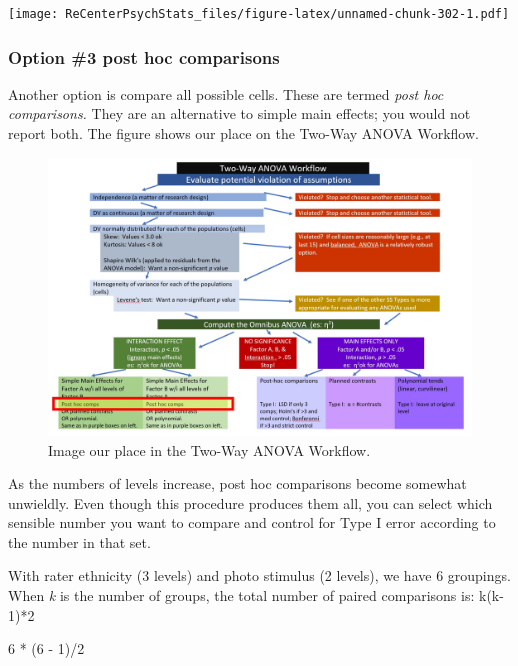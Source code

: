 \documentclass[
  11pt,
]{book}
\newenvironment{Shaded}{\begin{snugshade}}{\end{snugshade}}
\newcommand{\DecValTok}[1]{\textcolor[rgb]{0.00,0.00,0.81}{#1}}
\newcommand{\NormalTok}[1]{#1}
\newcommand{\SpecialCharTok}[1]{\textcolor[rgb]{0.00,0.00,0.00}{#1}}
\begin{document}
\texttt{[image: ReCenterPsychStats\_files/figure-latex/unnamed-chunk-302-1.pdf]}

\hypertarget{option-3-post-hoc-comparisons}{%
\subsubsection{Option \#3 post hoc comparisons}\label{option-3-post-hoc-comparisons}}

Another option is compare all possible cells. These are termed \emph{post hoc comparisons.} They are an alternative to simple main effects; you would not report both. The figure shows our place on the Two-Way ANOVA Workflow.

\begin{figure}
\centering
\includegraphics{images/factorial/WrkFlw_IntPH.jpg}
\caption{Image our place in the Two-Way ANOVA Workflow.}
\end{figure}

As the numbers of levels increase, post hoc comparisons become somewhat unwieldly. Even though this procedure produces them all, you can select which sensible number you want to compare and control for Type I error according to the number in that set.

With rater ethnicity (3 levels) and photo stimulus (2 levels), we have 6 groupings. When \emph{k} is the number of groups, the total number of paired comparisons is: k(k-1)*2

\begin{Shaded}
\begin{Highlighting}[]
\DecValTok{6} \SpecialCharTok{*}\NormalTok{ (}\DecValTok{6} \SpecialCharTok{{-}} \DecValTok{1}\NormalTok{)}\SpecialCharTok{/}\DecValTok{2}
\end{Highlighting}
\end{Shaded}
\end{document}
